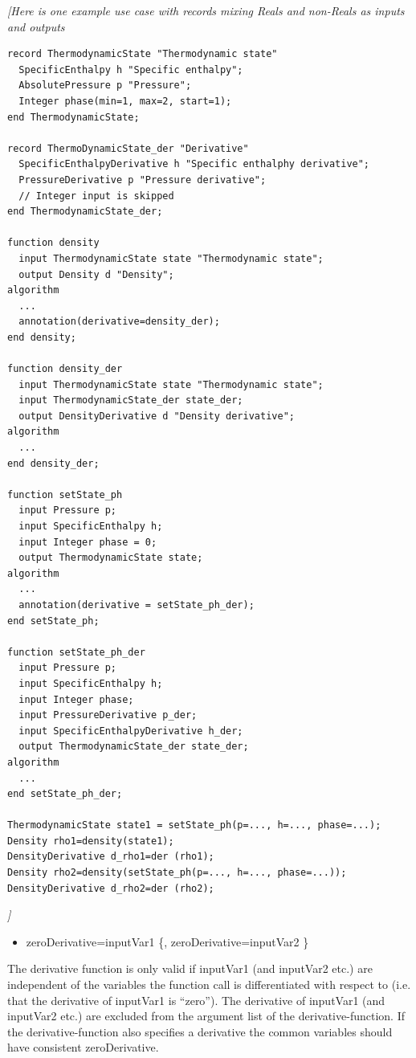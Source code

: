 \documentclass[10pt,a4paper]{report}
\begin{document}
\emph{{[}Here is one example use case with records mixing Reals and
non-Reals as inputs and outputs}

\begin{lstlisting}[language=modelica]
record ThermodynamicState "Thermodynamic state"
  SpecificEnthalpy h "Specific enthalpy";
  AbsolutePressure p "Pressure";
  Integer phase(min=1, max=2, start=1);
end ThermodynamicState;

record ThermoDynamicState_der "Derivative"
  SpecificEnthalpyDerivative h "Specific enthalphy derivative";
  PressureDerivative p "Pressure derivative";
  // Integer input is skipped
end ThermodynamicState_der;

function density
  input ThermodynamicState state "Thermodynamic state";
  output Density d "Density";
algorithm 
  ...
  annotation(derivative=density_der);
end density;

function density_der
  input ThermodynamicState state "Thermodynamic state";
  input ThermodynamicState_der state_der;
  output DensityDerivative d "Density derivative";
algorithm 
  ...
end density_der;

function setState_ph
  input Pressure p;
  input SpecificEnthalpy h;
  input Integer phase = 0;
  output ThermodynamicState state;
algorithm
  ...
  annotation(derivative = setState_ph_der);
end setState_ph;

function setState_ph_der
  input Pressure p;
  input SpecificEnthalpy h;
  input Integer phase;
  input PressureDerivative p_der;
  input SpecificEnthalpyDerivative h_der;
  output ThermodynamicState_der state_der;
algorithm
  ...
end setState_ph_der;

ThermodynamicState state1 = setState_ph(p=..., h=..., phase=...);
Density rho1=density(state1);
DensityDerivative d_rho1=der (rho1);
Density rho2=density(setState_ph(p=..., h=..., phase=...));
DensityDerivative d_rho2=der (rho2);
\end{lstlisting}
\emph{{]}}

\begin{itemize}
\item
  zeroDerivative=inputVar1 \{, zeroDerivative=inputVar2 \}
\end{itemize}

The derivative function is only valid if inputVar1 (and inputVar2 etc.)
are independent of the variables the function call is differentiated
with respect to (i.e. that the derivative of inputVar1 is ``zero''). The
derivative of inputVar1 (and inputVar2 etc.) are excluded from the
argument list of the derivative-function. If the derivative-function
also specifies a derivative the common variables should have consistent
zeroDerivative.
\end{document}
